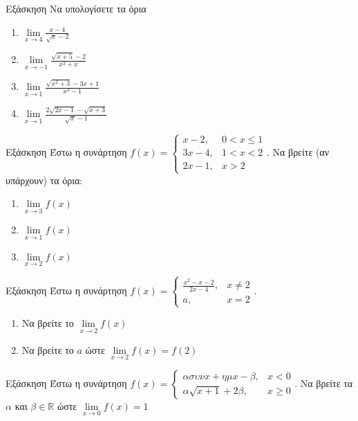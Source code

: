 \documentclass[greek]{beamer}
\begin{document}
\begin{frame}{Εξάσκηση}
  Να υπολογίσετε τα όρια
  \begin{enumerate}
    \item $\lim\limits_{x \to 4}{ \frac{x-4}{\sqrt{x}-2} }$ \pause
    \item $\lim\limits_{x \to -1}{ \frac{\sqrt{x+5}-2}{x^2+x} }$ \pause
    \item $\lim\limits_{x \to 1}{ \frac{\sqrt{x^2+3}-3x+1}{x^2-1} }$ \pause
    \item $\lim\limits_{x \to 1}{ \frac{2\sqrt{2x-1}-\sqrt{x+3}}{\sqrt{x}-1} }$
  \end{enumerate}
\end{frame}

\begin{frame}{Εξάσκηση}
  Έστω η συνάρτηση $f(x)=\begin{cases}
      x-2,  & 0<x\le 1 \\
      3x-4, & 1<x<2    \\
      2x-1, & x>2
    \end{cases}$.
  Να βρείτε (αν υπάρχουν) τα όρια:
  \begin{enumerate}
    \item $\lim\limits_{x \to 3}{ f(x) }$ \pause
    \item $\lim\limits_{x \to 1}{ f(x) }$ \pause
    \item $\lim\limits_{x \to 2}{ f(x) }$
  \end{enumerate}
\end{frame}

\begin{frame}{Εξάσκηση}
  Έστω η συνάρτηση $f(x)=\begin{cases}
      \frac{x^2-x-2}{2x-4}, & x\ne 2 \\
      a,                    & x=2
    \end{cases}$.
  \begin{enumerate}
    \item Να βρείτε το $\lim\limits_{x \to 2}{ f(x) }$ \pause
    \item Να βρείτε το $a$ ώστε $\lim\limits_{x \to 2}{ f(x) }=f(2)$
  \end{enumerate}
\end{frame}

\begin{frame}{Εξάσκηση}
  Έστω η συνάρτηση $f(x)=\begin{cases}
      ασυνx+ημx-β,    & x<0    \\
      α\sqrt{x+1}+2β, & x\ge 0
    \end{cases}$.
  Να βρείτε τα $α$ και $β\in\mathbb{R}$ ώστε $\lim\limits_{x \to 0}{ f(x) }=1$
\end{frame}
\end{document}
